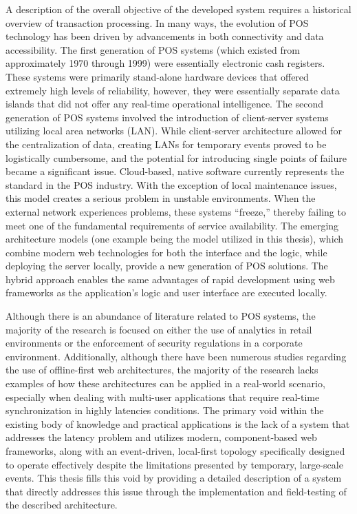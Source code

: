 A description of the overall objective of the developed system requires a historical overview of transaction processing. In many ways, the evolution of POS technology has been driven by advancements in both connectivity and data accessibility. The first generation of POS systems (which existed from approximately 1970 through 1999) were essentially electronic cash registers. These systems were primarily stand-alone hardware devices that offered extremely high levels of reliability, however, they were essentially separate data islands that did not offer any real-time operational intelligence. The second generation of POS systems involved the introduction of client-server systems utilizing local area networks (LAN). While client-server architecture allowed for the centralization of data, creating LANs for temporary events proved to be logistically cumbersome, and the potential for introducing single points of failure became a significant issue. Cloud-based, native software currently represents the standard in the POS industry. With the exception of local maintenance issues, this model creates a serious problem in unstable environments. When the external network experiences problems, these systems ``freeze,'' thereby failing to meet one of the fundamental requirements of service availability. The emerging architecture models (one example being the model utilized in this thesis), which combine modern web technologies for both the interface and the logic, while deploying the server locally, provide a new generation of POS solutions. The hybrid approach enables the same advantages of rapid development using web frameworks as the application's logic and user interface are executed locally. 

Although there is an abundance of literature related to POS systems, the majority of the research is focused on either the use of analytics in retail environments or the enforcement of security regulations in a corporate environment. Additionally, although there have been numerous studies regarding the use of offline-first web architectures, the majority of the research lacks examples of how these architectures can be applied in a real-world scenario, especially when dealing with multi-user applications that require real-time synchronization in highly latencies conditions. The primary void within the existing body of knowledge and practical applications is the lack of a system that addresses the latency problem and utilizes modern, component-based web frameworks, along with an event-driven, local-first topology specifically designed to operate effectively despite the limitations presented by temporary, large-scale events. This thesis fills this void by providing a detailed description of a system that directly addresses this issue through the implementation and field-testing of the described architecture.